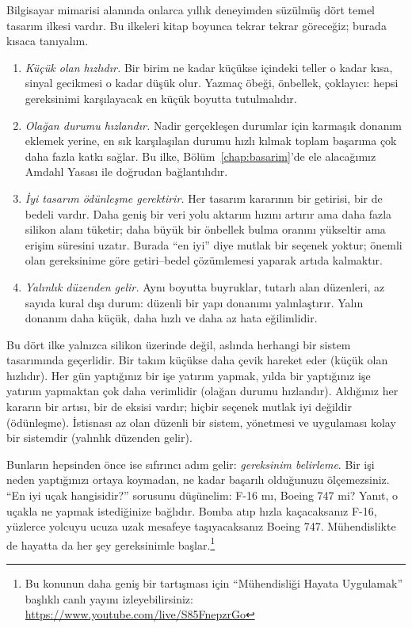 Bilgisayar mimarisi alanında onlarca yıllık deneyimden süzülmüş dört temel tasarım ilkesi vardır. Bu ilkeleri kitap boyunca tekrar tekrar göreceğiz; burada kısaca tanıyalım.

\begin{enumerate}
    \item \emph{Küçük olan hızlıdır.} Bir birim ne kadar küçükse içindeki teller o kadar kısa, sinyal gecikmesi o kadar düşük olur. Yazmaç öbeği, önbellek, çoklayıcı: hepsi gereksinimi karşılayacak en küçük boyutta tutulmalıdır.
    \item \emph{Olağan durumu hızlandır.} Nadir gerçekleşen durumlar için karmaşık donanım eklemek yerine, en sık karşılaşılan durumu hızlı kılmak toplam başarıma çok daha fazla katkı sağlar. Bu ilke, Bölüm~\ref{chap:basarim}'de ele alacağımız Amdahl Yasası ile doğrudan bağlantılıdır.
    \item \emph{İyi tasarım ödünleşme gerektirir.} Her tasarım kararının bir getirisi, bir de bedeli vardır. Daha geniş bir veri yolu aktarım hızını artırır ama daha fazla silikon alanı tüketir; daha büyük bir önbellek bulma oranını yükseltir ama erişim süresini uzatır. Burada ``en iyi'' diye mutlak bir seçenek yoktur; önemli olan gereksinime göre getiri--bedel çözümlemesi yaparak artıda kalmaktır.
    \item \emph{Yalınlık düzenden gelir.} Aynı boyutta buyruklar, tutarlı alan düzenleri, az sayıda kural dışı durum: düzenli bir yapı donanımı yalınlaştırır. Yalın donanım daha küçük, daha hızlı ve daha az hata eğilimlidir.
\end{enumerate}

\begin{bilginot}
Bu dört ilke yalnızca silikon üzerinde değil, aslında herhangi bir sistem tasarımında geçerlidir. Bir takım küçükse daha çevik hareket eder (küçük olan hızlıdır). Her gün yaptığınız bir işe yatırım yapmak, yılda bir yaptığınız işe yatırım yapmaktan çok daha verimlidir (olağan durumu hızlandır). Aldığınız her kararın bir artısı, bir de eksisi vardır; hiçbir seçenek mutlak iyi değildir (ödünleşme). İstisnası az olan düzenli bir sistem, yönetmesi ve uygulaması kolay bir sistemdir (yalınlık düzenden gelir).

Bunların hepsinden önce ise sıfırıncı adım gelir: \emph{gereksinim belirleme}. Bir işi neden yaptığınızı ortaya koymadan, ne kadar başarılı olduğunuzu ölçemezsiniz. ``En iyi uçak hangisidir?'' sorusunu düşünelim: F-16 mı, Boeing 747 mi? Yanıt, o uçakla ne yapmak istediğinize bağlıdır. Bomba atıp hızla kaçacaksanız F-16, yüzlerce yolcuyu ucuza uzak mesafeye taşıyacaksanız Boeing 747. Mühendislikte de hayatta da her şey gereksinimle başlar.\footnote{Bu konunun daha geniş bir tartışması için ``Mühendisliği Hayata Uygulamak'' başlıklı canlı yayını izleyebilirsiniz: \url{https://www.youtube.com/live/S85FnepzrGo}}
\end{bilginot}

